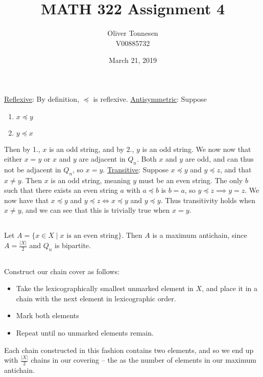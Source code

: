 \documentclass{article}
\title{MATH 322 Assignment 4}
\author{Oliver Tonnesen\\V00885732}
\date{March 21, 2019}
\begin{document}
\maketitle
\renewcommand{\thesubsection}{\thesection.\alph{subsection}}
\section{} %
\subsection{} %
\underline{Reflexive}: By definition, $\preceq$ is reflexive.
\newline
\underline{Antisymmetric}: Suppose
\begin{enumerate}
	\item $x\preceq y$
	\item $y\preceq x$
\end{enumerate}
Then by 1., $x$ is an odd string, and by 2., $y$ is an odd string. We now now
that either $x=y$ or $x$ and $y$ are adjacent in $Q_n$. Both $x$ and $y$ are
odd, and can thus not be adjacent in $Q_n$, so $x=y$.
\newline
\underline{Transitive}: Suppose $x\preceq y$ and $y\preceq z$, and that
$x\neq y$. Then $x$ is an odd string, meaning $y$ must be an even string. The
only $b$ such that there exists an even string $a$ with $a\preceq b$ is $b=a$,
so $y\preceq z\implies y=z$. We now have that
$x\preceq y$ and $y\preceq z\iff x\preceq y$ and $y\preceq y$. Thus transitivity
holds when $x\neq y$, and we can see that this is trivially true when $x=y$.
\subsection{} %
Let $A=\{x\in X\mid\text{$x$ is an even string}\}$. Then $A$ is a maximum
antichain, since $A=\frac{|X|}{2}$ and $Q_n$ is bipartite.
\subsection{} %
Construct our chain cover as follows:
\begin{itemize}
	\item Take the lexicographically smallest unmarked element in $X$, and
		place it in a chain with the next element in lexicographic order.
	\item Mark both elements
	\item Repeat until no unmarked elements remain.
\end{itemize}
Each chain constructed in this fashion contains two elements, and so we end up
with $\frac{|X|}{2}$ chains in our covering -- the as the number of elements in
our maximum antichain.
\end{document}
